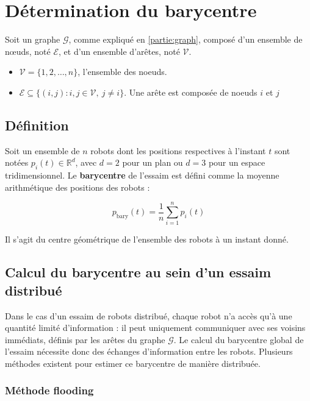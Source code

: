 \chapter{Détermination du barycentre}

Soit un graphe $\mathcal{G}$, comme expliqué en \ref{partie:graph},  composé d’un ensemble de nœuds, noté $\mathcal{E}$, et d’un ensemble d’arêtes, noté $\mathcal{V}$.
\begin{itemize}
    \item $\mathcal{V}=\{1, 2, \ldots, n\}$, l'ensemble des noeuds.
    \item $\mathcal{E}\subseteq \{(i, j) : i, j \in \mathcal{V},\ j \ne i\}$. Une arête est composée de noeuds $i$ et $j$
\end{itemize}

\section{Définition }

Soit un ensemble de $n$ robots dont les positions respectives à l’instant $t$ sont notées $p_i(t) \in \mathbb{R}^d$, avec $d = 2$ pour un plan ou $d = 3$ pour un espace tridimensionnel.
Le \textbf{barycentre} de l’essaim est défini comme la moyenne arithmétique des positions des robots :

\begin{equation}
p_{\text{bary}}(t) = \frac{1}{n} \sum_{i=1}^{n} p_i(t)
\end{equation}

Il s’agit du centre géométrique de l’ensemble des robots à un instant donné.

\section{Calcul du barycentre au sein d'un essaim distribué }

Dans le cas d’un essaim de robots distribué, chaque robot n'a accès qu'à une quantité limité d'information : il peut uniquement communiquer avec ses voisins immédiats, définis par les arêtes du graphe $\mathcal{G}$.  
Le calcul du barycentre global de l’essaim nécessite donc des échanges d’information entre les robots. Plusieurs méthodes existent pour estimer ce barycentre de manière distribuée.

\subsection{Méthode flooding}

